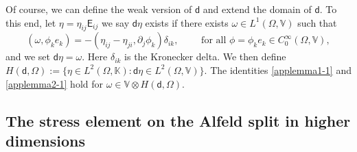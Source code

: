 \documentclass[12pt]{amsart}
\numberwithin{equation}{section}
\theoremstyle{definition}
\theoremstyle{remark}
\newcommand{\V}{\mathbb{V}}
\newcommand{\K}{\mathbb{K}}
\renewcommand{\(}{\bigl(}
\renewcommand{\)}{\bigr)}
\newcommand{\EK}{\mathsf{E}}
\newcommand{\dd}{\mathsf{d}}
\begin{document}
Of course, we can define the weak version of $\dd$ and extend the domain of $\dd$. To this end, let $\eta =\eta_{ij} \EK_{ij}$ we say $\dd \eta$ exists if there exists $\omega \in  L^1(\Omega, \V)$ such that
\begin{equation}\label{weakdd}
( \omega ,\phi_k  e_k)=  -( \eta_{ij} -\eta_{ji} , \partial_j \phi_k) \delta_{ik}, \qquad {\text{ for all }}  \phi = \phi_k e_k  \in C_0^\infty(\Omega, \V),   
\end{equation}
and we set $\dd \eta= \omega$. Here $\delta_{ik}$ is the Kronecker delta. We then define $H(\dd, \Omega):= \{ \eta \in L^2(\Omega, \K): \dd \eta \in L^2(\Omega, \V)\}$. The  identities \eqref{applemma1-1} and \eqref{applemma2-1} hold for $\omega \in \V \otimes H(\dd, \Omega)$.



% 
 

\subsection{The stress element on the Alfeld split in higher dimensions}
\label{ssec:stress-elem-ndim}
\end{document}

